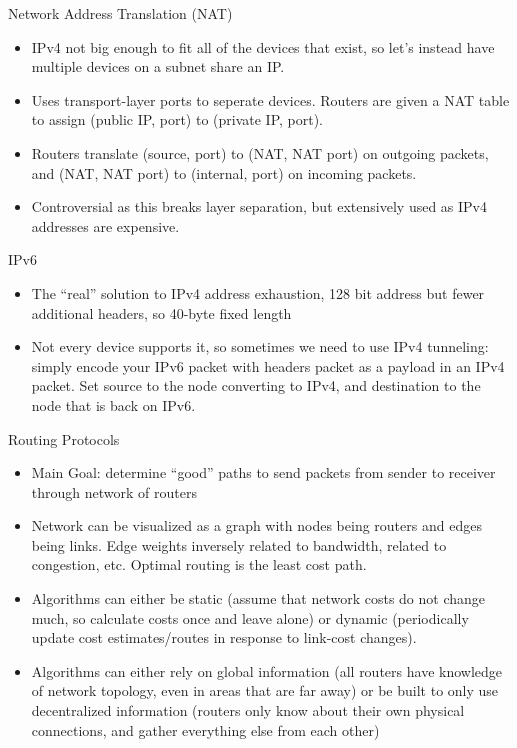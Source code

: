 \documentclass{beamer}
\begin{document}
\begin{frame}[t]{Network Address Translation (NAT)}
    \begin{itemize}
        \item IPv4 not big enough to fit all of the devices that exist, so let's instead have multiple devices on a subnet share an IP.
        \pause\item Uses transport-layer ports to seperate devices. Routers are given a NAT table to assign (public IP, port) to (private IP, port). 
        \pause\item Routers translate (source, port) to (NAT, NAT port) on outgoing packets, and (NAT, NAT port) to (internal, port) on incoming packets.
        \pause\item Controversial as this breaks layer separation, but extensively used as IPv4 addresses are expensive.
    \end{itemize}
\end{frame}

\begin{frame}[t]{IPv6}
    \begin{itemize}
        \item The ``real'' solution to IPv4 address exhaustion, 128 bit address but fewer additional headers, so 40-byte fixed length
        \item Not every device supports it, so sometimes we need to use IPv4 tunneling: simply encode your IPv6 packet with headers packet as a payload in an IPv4 packet. Set source to the node converting to IPv4, and destination to the node that is back on IPv6.
    \end{itemize}
\end{frame}

\begin{frame}[t]{Routing Protocols}
    \begin{itemize}
        \item \alert{Main Goal}: determine ``good'' paths to send packets from sender to receiver through network of routers
        \pause\item Network can be visualized as a \alert{graph} with nodes being routers and edges being links. Edge weights inversely related to bandwidth, related to congestion, etc. Optimal routing is the \alert{least cost} path.
        \pause\item Algorithms can either be \alert{static} (assume that network costs do not change much, so calculate costs once and leave alone) or \alert{dynamic} (periodically update cost estimates/routes in response to link-cost changes).
        \pause\item Algorithms can either rely on \alert{global} information (all routers have knowledge of network topology, even in areas that are far away) or be built to only use \alert{decentralized} information (routers only know about their own physical connections, and gather everything else from each other)
    \end{itemize}
\end{frame}
\end{document}
